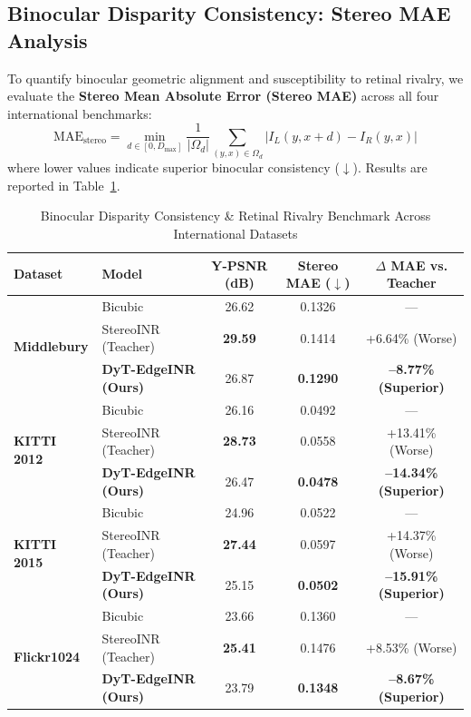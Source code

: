 \documentclass[conference]{IEEEtran}
\begin{document}
\subsection{Binocular Disparity Consistency: Stereo MAE Analysis}
To quantify binocular geometric alignment and susceptibility to retinal rivalry, we evaluate the \textbf{Stereo Mean Absolute Error (Stereo MAE)} across all four international benchmarks:
\begin{equation}
    \text{MAE}_{\text{stereo}} = \min_{d \in [0, D_{\max}]} \frac{1}{|\Omega_d|} \sum_{(y, x) \in \Omega_d} |I_L(y, x + d) - I_R(y, x)|
\end{equation}
where lower values indicate superior binocular consistency ($\downarrow$). Results are reported in Table~\ref{tab:stereo_mae}.

\begin{table}[t]
\centering
\caption{Binocular Disparity Consistency \& Retinal Rivalry Benchmark Across International Datasets}
\label{tab:stereo_mae}
\begin{tabular}{llccc}
\toprule
\textbf{Dataset} & \textbf{Model} & \textbf{Y-PSNR (dB)} & \textbf{Stereo MAE ($\downarrow$)} & \textbf{$\Delta$ MAE vs. Teacher} \\
\midrule
\multirow{3}{*}{\textbf{Middlebury}} 
& Bicubic & 26.62 & 0.1326 & --- \\
& StereoINR (Teacher) & \textbf{29.59} & 0.1414 & +6.64\% (Worse) \\
& \textbf{DyT-EdgeINR (Ours)} & 26.87 & \textbf{0.1290} & \textbf{--8.77\% (Superior)} \\
\midrule
\multirow{3}{*}{\textbf{KITTI 2012}} 
& Bicubic & 26.16 & 0.0492 & --- \\
& StereoINR (Teacher) & \textbf{28.73} & 0.0558 & +13.41\% (Worse) \\
& \textbf{DyT-EdgeINR (Ours)} & 26.47 & \textbf{0.0478} & \textbf{--14.34\% (Superior)} \\
\midrule
\multirow{3}{*}{\textbf{KITTI 2015}} 
& Bicubic & 24.96 & 0.0522 & --- \\
& StereoINR (Teacher) & \textbf{27.44} & 0.0597 & +14.37\% (Worse) \\
& \textbf{DyT-EdgeINR (Ours)} & 25.15 & \textbf{0.0502} & \textbf{--15.91\% (Superior)} \\
\midrule
\multirow{3}{*}{\textbf{Flickr1024}} 
& Bicubic & 23.66 & 0.1360 & --- \\
& StereoINR (Teacher) & \textbf{25.41} & 0.1476 & +8.53\% (Worse) \\
& \textbf{DyT-EdgeINR (Ours)} & 23.79 & \textbf{0.1348} & \textbf{--8.67\% (Superior)} \\
\bottomrule
\end{tabular}
\end{table}
\end{document}
